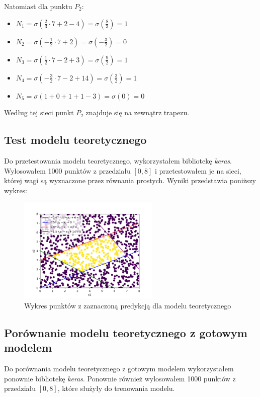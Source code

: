 \documentclass{article}
\begin{document}
Natomiast dla punktu $P_2$:
\begin{itemize}
    \centering
    \item $N_1 = \sigma(\frac{2}{3}\cdot7 + 2 - 4) = \sigma(\frac{8}{3}) = 1$
    \item $N_2 = \sigma(-\frac{1}{2}\cdot7 + 2) = \sigma(-\frac{3}{2}) = 0$
    \item $N_3 = \sigma(\frac{1}{2}\cdot7 - 2 + 3) = \sigma(\frac{9}{2}) = 1$
    \item $N_4 = \sigma(-\frac{3}{2}\cdot7 - 2 + 14) = \sigma(\frac{3}{2}) = 1$
    \item $N_5 = \sigma(1 + 0 + 1 + 1 - 3) = \sigma(0) = 0$
\end{itemize}
Według tej sieci punkt $P_2$ znajduje się na zewnątrz trapezu.

\subsection{Test modelu teoretycznego}

Do przetestowania modelu teoretycznego, wykorzystałem bibliotekę
\textit{keras}. Wylosowałem 1000 punktów z przedziału $[0, 8]$ i
przetestowałem je na sieci, której wagi są wyznaczone przez
równania prostych. Wyniki przedstawia poniższy wykres:

\begin{figure}[H]
    \centering
    \includegraphics[width=0.6\textwidth]{Zad4/punkty_teor.png}
    \caption{Wykres punktów z zaznaczoną predykcją dla modelu teoretycznego}
\end{figure}

\subsection{Porównanie modelu teoretycznego z gotowym modelem}

Do porównania modelu teoretycznego z gotowym modelem wykorzystałem
ponownie bibliotekę \textit{keras}. Ponownie również wylosowałem
1000 punktów z przedziału $[0, 8]$, które służyły do trenowania modelu.
\end{document}
